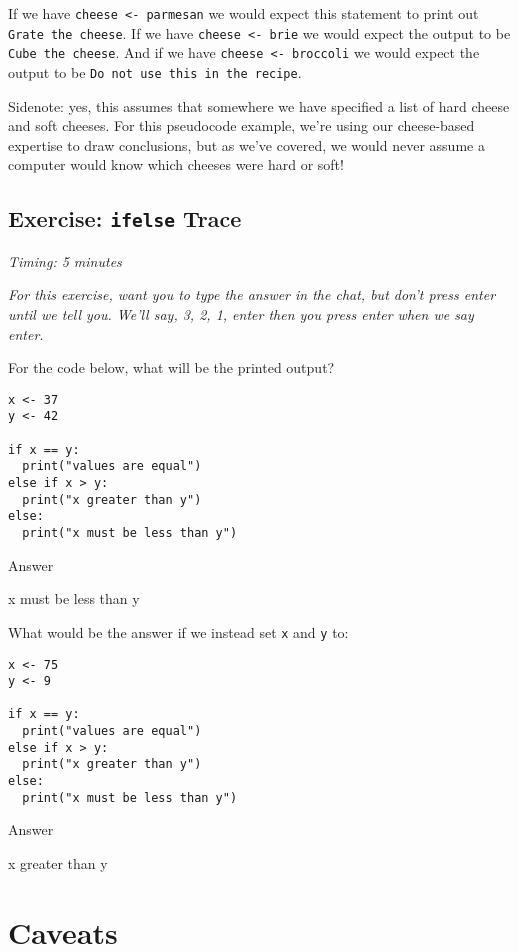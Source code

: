 \documentclass[
]{book}
\begin{document}
If we have \texttt{cheese\ \textless{}-\ parmesan} we would expect this statement to print out \texttt{Grate\ the\ cheese}. If we have \texttt{cheese\ \textless{}-\ brie} we would expect the output to be \texttt{Cube\ the\ cheese}. And if we have \texttt{cheese\ \textless{}-\ broccoli} we would expect the output to be \texttt{Do\ not\ use\ this\ in\ the\ recipe}.

Sidenote: yes, this assumes that somewhere we have specified a list of hard cheese and soft cheeses. For this pseudocode example, we're using our cheese-based expertise to draw conclusions, but as we've covered, we would never assume a computer would know which cheeses were hard or soft!

\subsection{\texorpdfstring{Exercise: \texttt{ifelse} Trace}{Exercise: ifelse Trace}}\label{exercise-ifelse-trace}

\emph{Timing: 5 minutes}

\emph{For this exercise, want you to type the answer in the chat, but don't press enter until we tell you. We'll say, \emph{3, 2, 1, enter} then you press enter when we say \emph{enter}.}

For the code below, what will be the printed output?

\begin{verbatim}
x <- 37
y <- 42

if x == y:
  print("values are equal")
else if x > y:
  print("x greater than y")
else:
  print("x must be less than y")
\end{verbatim}

Answer

x must be less than y

\hfill\break

What would be the answer if we instead set \texttt{x} and \texttt{y} to:

\begin{verbatim}
x <- 75
y <- 9

if x == y:
  print("values are equal")
else if x > y:
  print("x greater than y")
else:
  print("x must be less than y")
\end{verbatim}

Answer

x greater than y

\hfill\break

\section{Caveats}\label{caveats-1}
\end{document}
